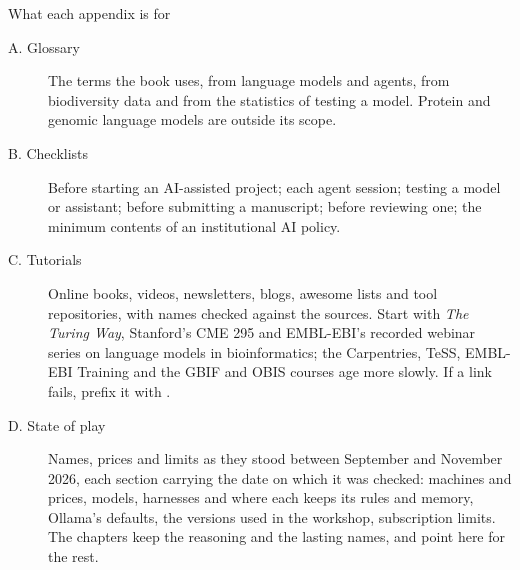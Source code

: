 \documentclass[11pt,aspectratio=169]{beamer}
\begin{document}
\begin{frame}{What each appendix is for}
  \small
  \begin{description}
    \item[A. Glossary] The terms the book uses, from language models and
      agents, from biodiversity data and from the statistics of testing a
      model. Protein and genomic language models are outside its scope.
    \item[B. Checklists] Before starting an AI-assisted project; each agent
      session; testing a model or assistant; before submitting a manuscript;
      before reviewing one; the minimum contents of an institutional AI
      policy.
    \item[C. Tutorials] Online books, videos, newsletters, blogs, awesome
      lists and tool repositories, with names checked against the sources.
      Start with \emph{The Turing Way}, Stanford's CME 295 and EMBL-EBI's
      recorded webinar series on language models in bioinformatics; the
      Carpentries, TeSS, EMBL-EBI Training and the GBIF and OBIS courses age
      more slowly. If a link fails, prefix it with
      .
    \item[D. State of play] Names, prices and limits as they stood between
      September and November 2026, each section carrying the date on which it
      was checked: machines and prices, models, harnesses and where each keeps
      its rules and memory, Ollama's defaults, the versions used in the
      workshop, subscription limits. The chapters
      keep the reasoning and the lasting names, and point here for the rest.
  \end{description}
\end{frame}
\end{document}

